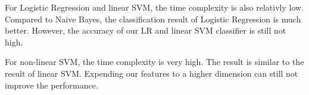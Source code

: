 \documentclass{article} %
\begin{document}
For Logistic Regression and linear SVM, the time complexity is also relativly low. Compared to Naive Bayes, the classification result of Logistic Regression is much better. However, the accuracy of our LR and linear SVM classifier is still not high. 

For non-linear SVM, the time complexity is very high. The result is similar to the result of linear SVM. Expending our features to a higher dimension can still not improve the performance.

\end{document}
